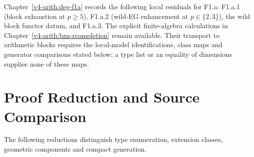 \begin{remark}
\label{v4-arith:f1a3-BH:rem:smallest-residual}
Chapter~\ref{v4-arith:deg-f1a} records the following local residuals
for F1.a:
F1.a.1 (block exhaustion at \(p\geq 5\)), F1.a.2 (wild-EG
enhancement at \(p\in\{2,3\}\)), the wild block functor datum,
and F1.a.3. The explicit finite-algebra calculations in
Chapter~\ref{v4-arith:bzn-rcompletion} remain available. Their
transport to arithmetic blocks requires the local-model identifications,
class maps and generator comparisons stated below; a type list or an
equality of dimensions supplies none of these maps.
\end{remark}

\section{Proof Reduction and Source Comparison}
\label{v4-arith:f1a3-BH:table}

The following reductions distinguish type enumeration, extension
classes, geometric components and compact generation.

